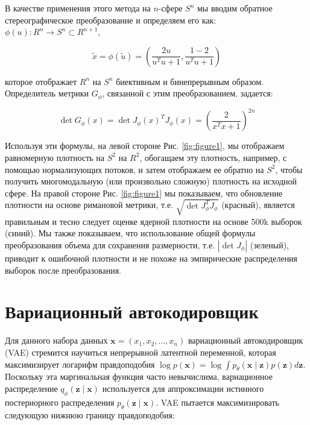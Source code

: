 \documentclass{article}
\begin{document}
В качестве применения этого метода на \( n \)-сфере \( S^n \) мы вводим обратное стереографическое преобразование и определяем его как: \( \phi(u) : R^n \rightarrow S^n \subset R^{n+1} \),

\begin{equation}
    \tilde{x} = \phi(\tilde{u}) = \left( \frac{2u}{u^T u + 1}, \frac{1 - 2}{u^T u + 1} \right)
    \label{eq:inverse_stereographic}
\end{equation}

которое отображает \( R^n \) на \( S^n \) биективным и бинепрерывным образом. Определитель метрики \( G_\phi \), связанной с этим преобразованием, задается:

\begin{equation}
    \det G_\phi(x) = \det J_\phi(x)^T J_\phi(x) = \left( \frac{2}{x^T x + 1} \right)^{2n}
    \label{eq:det_metric}
\end{equation}

Используя эти формулы, на левой стороне Рис. \ref{fig:figure1}, мы отображаем равномерную плотность на \( S^2 \) на \( R^2 \), обогащаем эту плотность, например, с помощью нормализующих потоков, и затем отображаем ее обратно на \( S^2 \), чтобы получить многомодальную (или произвольно сложную) плотность на исходной сфере. На правой стороне Рис. \ref{fig:figure1} мы показываем, что обновление плотности на основе римановой метрики, т.е. \( \sqrt{\det J_\phi^T J_\phi} \) (красный), является правильным и тесно следует оценке ядерной плотности на основе 500k выборок (синий). Мы также показываем, что использование общей формулы преобразования объема для сохранения размерности, т.е. \( |\det J_\phi| \) (зеленый), приводит к ошибочной плотности и не похоже на эмпирические распределения выборок после преобразования.

\section{Вариационный автокодировщик}
Для данного набора данных \(\mathbf{x} = (x_1, x_2, \ldots, x_n)\) вариационный автокодировщик (VAE) стремится научиться непрерывной латентной переменной, которая максимизирует логарифм правдоподобия \(\log p(\mathbf{x}) = \log \int p_{\theta}(\mathbf{x} \mid \mathbf{z}) p(\mathbf{z}) d\mathbf{z}\). Поскольку эта маргинальная функция часто невычислима, вариационное распределение \(q_{\phi}(\mathbf{z} \mid \mathbf{x})\) используется для аппроксимации истинного постериорного распределения \(p_{\theta}(\mathbf{z} \mid \mathbf{x})\). VAE пытается максимизировать следующую нижнюю границу правдоподобия:
\end{document}
